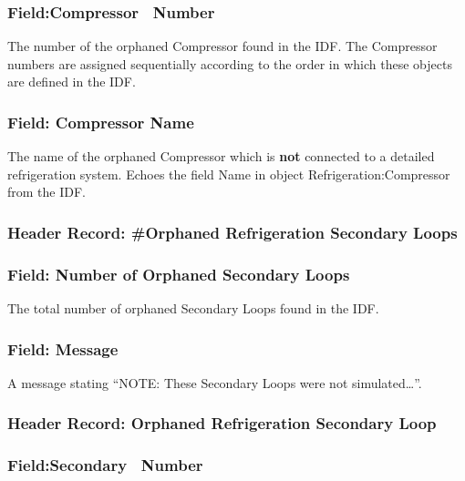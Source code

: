 \subsubsection{Field:Compressor ~Number}\label{fieldcompressor-number}

The number of the orphaned Compressor found in the IDF. The Compressor numbers are assigned sequentially according to the order in which these objects are defined in the IDF.

\subsubsection{Field: Compressor Name}\label{field-compressor-name-1}

The name of the orphaned Compressor which is \textbf{not} connected to a detailed refrigeration system. Echoes the field Name in object Refrigeration:Compressor from the IDF.

\subsubsection{Header Record: \#Orphaned Refrigeration Secondary Loops}\label{header-record-orphaned-refrigeration-secondary-loops}

\subsubsection{Field: Number of Orphaned Secondary Loops}\label{field-number-of-orphaned-secondary-loops}

The total number of orphaned Secondary Loops found in the IDF.

\subsubsection{Field: Message}\label{field-message-3}

A message stating ``NOTE: These Secondary Loops were not simulated\ldots{}''.

\subsubsection{Header Record: Orphaned Refrigeration Secondary Loop}\label{header-record-orphaned-refrigeration-secondary-loop}

\subsubsection{Field:Secondary ~Number}\label{fieldsecondary-number}

